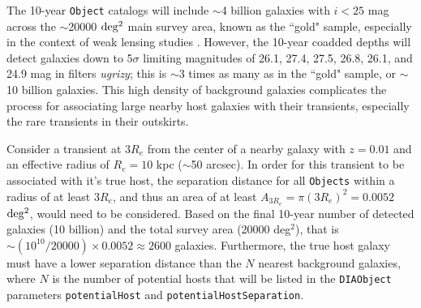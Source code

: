 \documentclass[DM,authoryear,toc]{lsstdoc}
\begin{document}
The 10-year {\tt Object} catalogs will include $\sim$4 billion galaxies with $i<25$ mag across the $\sim$20000 $\rm deg^2$ main survey area, known as the ``gold" sample, especially in the context of weak lensing studies .
However, the 10-year coadded depths will detect galaxies down to 5$\sigma$ limiting magnitudes of 26.1, 27.4, 27.5, 26.8, 26.1, and 24.9 mag in filters {\it ugrizy}; this is $\sim$3 times as many as in the ``gold" sample, or $\sim$10 billion galaxies.
This high density of background galaxies complicates the process for associating large nearby host galaxies with their transients, especially the rare transients in their outskirts.

Consider a transient at $3R_e$ from the center of a nearby galaxy with $z=0.01$ and an effective radius of $R_e = 10$ kpc ($\sim$50 arcsec).
In order for this transient to be associated with it's true host, the separation distance for all {\tt Objects} within a radius of at least $3R_e$, and thus an area of at least $A_{3R_e} = \pi (3R_e)^2 = 0.0052$ $\rm deg^2$, would need to be considered.
Based on the final 10-year number of detected galaxies (10 billion) and the total survey area (20000 deg$^2$), that is $\sim (10^10 / 20000) \times 0.0052 \approx 2600$ galaxies.
Furthermore, the true host galaxy must have a lower separation distance than the $N$ nearest background galaxies, where $N$ is the number of potential hosts that will be listed in the {\tt DIAObject} parameters {\tt potentialHost} and {\tt potentialHostSeparation}.
\end{document}
